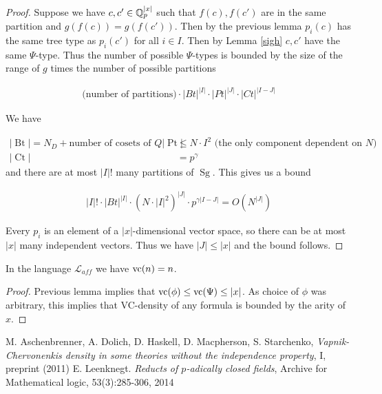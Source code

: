 \documentclass{amsart}
\newcommand{\LLA}{\mathcal L_{aff}}
\DeclareMathOperator{\Sg}{Sg}
\DeclareMathOperator{\Bt}{Bt}
\DeclareMathOperator{\Pt}{Pt}
\DeclareMathOperator{\Ct}{Ct}
\begin{document}
\begin{proof}
	Suppose we have $c, c' \in \mathbb{Q}_p^{|x|}$ such that $f(c), f(c')$ are in the same partition and $g(f(c)) = g(f(c'))$.
	Then by the previous lemma $p_i(c)$ has the same tree type as $p_i(c')$ for all $i\in I$.
	Then by Lemma \ref{sigh} $c, c'$ have the same $\Psi$-type.
	Thus the number of possible $\Psi$-types is bounded by the size of the range of $g$ times the number of possible partitions
	
	\begin{align*}
		\text{(number of partitions)} \cdot |Bt|^{|I|} \cdot |Pt|^{|J|} \cdot |Ct|^{|I-J|}
	\end{align*}
	
	We have
	
	\begin{align*}
		|\Bt| = N_D + \text {number of cosets of $Q$}
		|\Pt| &\leq N \cdot I^2 \text { (the only component dependent on $N$)} \\
		|\Ct| &= p^\gamma 
	\end{align*}
	and there are at most ${|I|}!$ many partitions of $\Sg$. 
	This gives us a bound
	
	\begin{align*}
		{|I|}! \cdot |Bt|^{|I|} \cdot (N \cdot {|I|}^2)^{|J|} \cdot p^{\gamma {|I-J|}} = O(N^{|J|})
	\end{align*}	
	
	Every $p_i$ is an element of a $|x|$-dimensional vector space, so there can be at most $|x|$ many independent vectors.
	Thus we have $|J| \leq |x|$ and the bound follows.
\end{proof}

\begin{Corollary}
	In the language $\LLA$ we have $\operatorname{vc}(n) = n$.
\end{Corollary}

\begin{proof}
	Previous lemma implies that $\operatorname{vc}(\phi) \leq \operatorname{vc}(\Psi) \leq |x|$.
	As choice of $\phi$ was arbitrary, this implies that VC-density of any formula is bounded by the arity of $x$.
\end{proof}

\begin{thebibliography}{9}
		M. Aschenbrenner, A. Dolich, D. Haskell, D. Macpherson, S. Starchenko,
		\textit{Vapnik-Chervonenkis density in some theories without the independence property}, I, preprint (2011)
		E. Leenknegt. \textit{Reducts of $p$-adically closed fields}, Archive for Mathematical logic, 53(3):285-306, 2014
\end{thebibliography}
\end{document}
